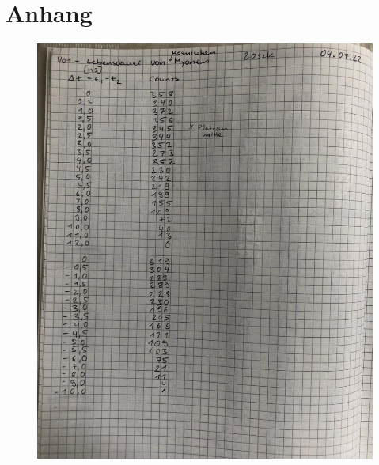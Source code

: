 \section{Anhang}
\label{sec:anhang}

\begin{figure}
    \centering
    \includegraphics[width=\textwidth]{bilder/Anlage1.jpeg}

\end{figure}
